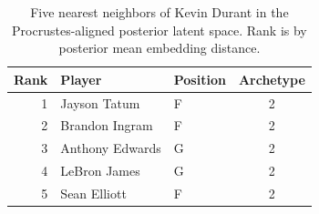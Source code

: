 \begin{table}[htbp]
  \centering\small
  \begin{tabular}{rllc}
    \toprule
    Rank & Player & Position & Archetype \\
    \midrule
    1 & Jayson Tatum & F & 2 \\
    2 & Brandon Ingram & F & 2 \\
    3 & Anthony Edwards & G & 2 \\
    4 & LeBron James & G & 2 \\
    5 & Sean Elliott & F & 2 \\
    \bottomrule
  \end{tabular}
  \caption{Five nearest neighbors of Kevin Durant in the Procrustes-aligned posterior latent space. Rank is by posterior mean embedding distance.}
  \label{tab:Kevin_Durant_neighbors}
\end{table}

